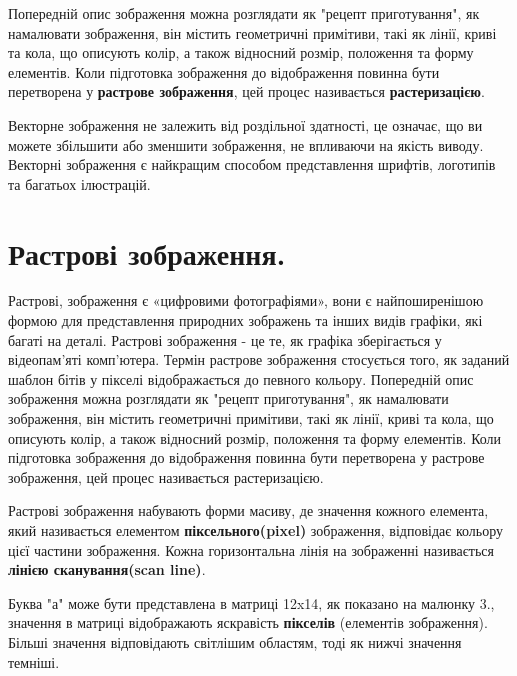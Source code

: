 \documentclass[11pt]{article}
\begin{document}
    Попередній опис зображення можна розглядати як "рецепт приготування", як намалювати зображення, він містить геометричні примітиви, такі як лінії, криві та кола, що описують колір, а також відносний розмір, положення та форму елементів.
    Коли підготовка зображення до відображення повинна бути перетворена у \textbf{растрове зображення}, цей процес називається \textbf{растеризацією}.

    Векторне зображення не залежить від роздільної здатності, це означає, що ви можете збільшити або зменшити зображення, не впливаючи на якість виводу.
    Векторні зображення є найкращим способом представлення шрифтів, логотипів та багатьох ілюстрацій.

    \section{Растрові зображення.}\label{subsec:bitmap_image}

    Растрові, зображення є «цифровими фотографіями», вони є найпоширенішою формою для представлення природних зображень та інших видів графіки, які багаті на деталі.
    Растрові зображення - це те, як графіка зберігається у відеопам’яті комп’ютера.
    Термін растрове зображення стосується того, як заданий шаблон бітів у пікселі відображається до певного кольору.
    Попередній опис зображення можна розглядати як "рецепт приготування", як намалювати зображення, він містить геометричні примітиви, такі як лінії, криві та кола, що описують колір, а також відносний розмір, положення та форму елементів. Коли підготовка зображення до відображення повинна бути перетворена у растрове зображення, цей процес називається растеризацією.

    Растрові зображення набувають форми масиву, де значення кожного елемента, який називається елементом \textbf{піксельного(pixel)} зображення, відповідає кольору цієї частини зображення.
    Кожна горизонтальна лінія на зображенні називається \textbf{лінією сканування(scan line)}.

    Буква "а" може бути представлена в матриці 12x14, як показано на малюнку 3., значення в матриці відображають яскравість \textbf{пікселів} (елементів зображення).
    Більші значення відповідають світлішим областям, тоді як нижчі значення темніші.
\end{document}
